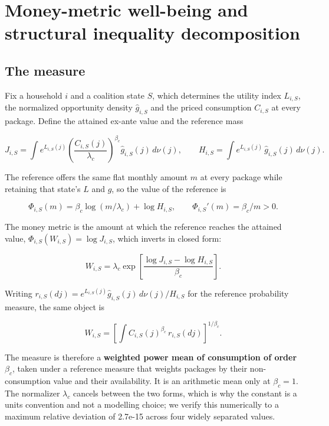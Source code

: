 \section{Money-metric well-being and structural inequality decomposition}\label{money-metric-well-being-and-structural-inequality-decomposition}

\subsection{The measure}\label{the-measure}

Fix a household \(i\) and a coalition state \(S\), which determines the utility index \(L_{i,S}\), the normalized opportunity density \(\widehat g_{i,S}\) and the priced consumption \(C_{i,S}\) at every package. Define the attained ex-ante value and the reference mass

\[
J_{i,S}=\int e^{L_{i,S}(j)}\left(\frac{C_{i,S}(j)}{\lambda_c}\right)^{\beta_c}\widehat g_{i,S}(j)\,d\nu(j),
\qquad
H_{i,S}=\int e^{L_{i,S}(j)}\,\widehat g_{i,S}(j)\,d\nu(j).
\]

The reference offers the same flat monthly amount \(m\) at every package while retaining that state's \(L\) and \(\widehat g\), so the value of the reference is

\[
\Phi_{i,S}(m)=\beta_c\log(m/\lambda_c)+\log H_{i,S},
\qquad \Phi_{i,S}'(m)=\beta_c/m>0 .
\]

The money metric is the amount at which the reference reaches the attained value, \(\Phi_{i,S}(W_{i,S})=\log J_{i,S}\), which inverts in closed form:

\[
\boxed{\;W_{i,S}=\lambda_c\exp\!\left[\frac{\log J_{i,S}-\log H_{i,S}}{\beta_c}\right].\;}
\]

Writing \(r_{i,S}(dj)=e^{L_{i,S}(j)}\widehat g_{i,S}(j)\,d\nu(j)/H_{i,S}\) for the reference probability measure, the same object is

\[
\boxed{\;W_{i,S}=\left[\int C_{i,S}(j)^{\beta_c}\,r_{i,S}(dj)\right]^{1/\beta_c}.\;}
\]

The measure is therefore a \textbf{weighted power mean of consumption of order \(\beta_c\)}, taken under a reference measure that weights packages by their non-consumption value and their availability. It is an arithmetic mean only at \(\beta_c=1\). The normalizer \(\lambda_c\) cancels between the two forms, which is why the constant is a units convention and not a modelling choice; we verify this numerically to a maximum relative deviation of 2.7e-15 across four widely separated values.

